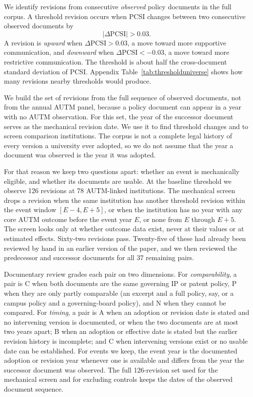 We identify revisions from consecutive \emph{observed} policy documents in the full corpus. A threshold revision occurs when PCSI changes between two consecutive observed documents by
\[
|\Delta\mathrm{PCSI}|>0.03.
\]
A revision is \emph{upward} when $\Delta\mathrm{PCSI}>0.03$, a move toward more supportive communication, and \emph{downward} when $\Delta\mathrm{PCSI}<-0.03$, a move toward more restrictive communication. The threshold is about half the cross-document standard deviation of PCSI. Appendix Table~\ref{tab:thresholduniverse} shows how many revisions nearby thresholds would produce.

We build the set of revisions from the full sequence of observed documents, not from the annual AUTM panel, because a policy document can appear in a year with no AUTM observation. For this set, the year of the successor document serves as the mechanical revision date. We use it to find threshold changes and to screen comparison institutions. The corpus is not a complete legal history of every version a university ever adopted, so we do not assume that the year a document was observed is the year it was adopted.

For that reason we keep two questions apart: whether an event is mechanically eligible, and whether its documents are usable. At the baseline threshold we observe 126 revisions at 78 AUTM-linked institutions. The mechanical screen drops a revision when the same institution has another threshold revision within the event window $[E-4,E+5]$, or when the institution has no year with any core AUTM outcome before the event year $E$, or none from $E$ through $E+5$. The screen looks only at whether outcome data exist, never at their values or at estimated effects. Sixty-two revisions pass. Twenty-five of these had already been reviewed by hand in an earlier version of the paper, and we then reviewed the predecessor and successor documents for all 37 remaining pairs.

Documentary review grades each pair on two dimensions. For \emph{comparability}, a pair is C when both documents are the same governing IP or patent policy, P when they are only partly comparable (an excerpt and a full policy, say, or a campus policy and a governing-board policy), and N when they cannot be compared. For \emph{timing}, a pair is A when an adoption or revision date is stated and no intervening version is documented, or when the two documents are at most two years apart; B when an adoption or effective date is stated but the earlier revision history is incomplete; and C when intervening versions exist or no usable date can be established. For events we keep, the event year is the documented adoption or revision year whenever one is available and differs from the year the successor document was observed. The full 126-revision set used for the mechanical screen and for excluding controls keeps the dates of the observed document sequence.

